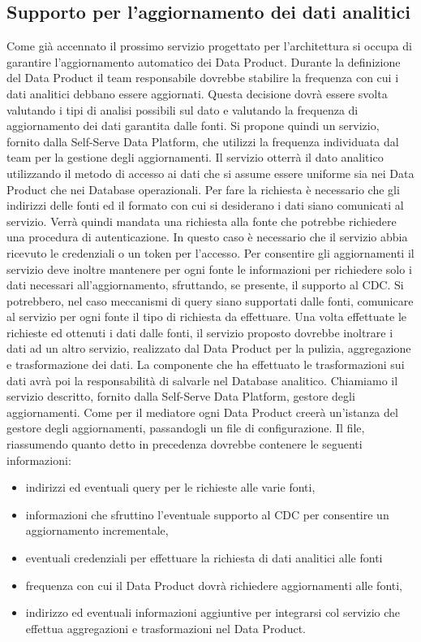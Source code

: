 \documentclass[12pt]{report}
\begin{document}
\subsection{Supporto per l'aggiornamento dei dati analitici}
Come già accennato il prossimo servizio progettato per l'architettura si occupa di garantire l'aggiornamento automatico dei Data Product.
Durante la definizione del Data Product il team responsabile dovrebbe stabilire la frequenza con cui i dati analitici debbano essere aggiornati.
Questa decisione dovrà essere svolta valutando i tipi di analisi possibili sul dato e valutando la frequenza di aggiornamento dei dati garantita dalle fonti. 
Si propone quindi un servizio, fornito dalla Self-Serve Data Platform, che utilizzi la frequenza individuata dal team per la gestione degli aggiornamenti.
Il servizio otterrà il dato analitico utilizzando il metodo di accesso ai dati che si assume essere uniforme sia nei Data Product che nei Database operazionali.
Per fare la richiesta è necessario che gli indirizzi delle fonti ed il formato con cui si desiderano i dati siano comunicati al servizio.
Verrà quindi mandata una richiesta alla fonte che potrebbe richiedere una procedura di autenticazione. 
In questo caso è necessario che il servizio abbia ricevuto le credenziali o un token per l'accesso.
Per consentire gli aggiornamenti il servizio deve inoltre mantenere per ogni fonte le informazioni per richiedere solo i dati necessari all'aggiornamento, sfruttando, se presente, il supporto al CDC.
Si potrebbero, nel caso meccanismi di query siano supportati dalle fonti, comunicare al servizio per ogni fonte il tipo di richiesta da effettuare. 
Una volta effettuate le richieste ed ottenuti i dati dalle fonti, il servizio proposto dovrebbe inoltrare i dati ad un altro servizio, realizzato dal Data Product per la pulizia, aggregazione e trasformazione dei dati. 
La componente che ha effettuato le trasformazioni sui dati avrà poi la responsabilità di salvarle nel Database analitico.
Chiamiamo il servizio descritto, fornito dalla Self-Serve Data Platform, gestore degli aggiornamenti.
Come per il mediatore ogni Data Product creerà un'istanza del gestore degli aggiornamenti, passandogli un file di configurazione.
Il file, riassumendo quanto detto in precedenza dovrebbe contenere le seguenti informazioni: 
\begin{itemize}
    \item indirizzi ed eventuali query per le richieste alle varie fonti,
    \item informazioni che sfruttino l'eventuale supporto al CDC per consentire un aggiornamento incrementale,
    \item eventuali credenziali per effettuare la richiesta di dati analitici alle fonti 
    \item frequenza con cui il Data Product dovrà richiedere aggiornamenti alle fonti, 
    \item indirizzo ed eventuali informazioni aggiuntive per integrarsi col servizio che effettua aggregazioni e trasformazioni nel Data Product.
\end{itemize}
\end{document}
